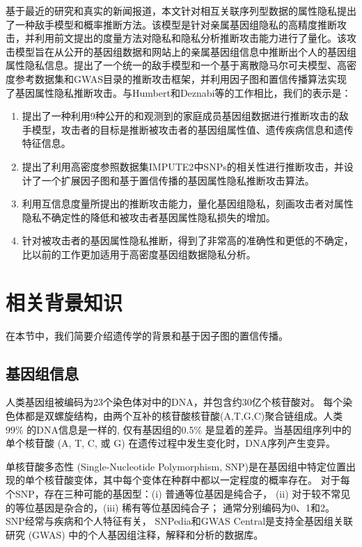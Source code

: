 基于最近的研究和真实的新闻报道，本文针对相互关联序列型数据的属性隐私提出了一种敌手模型和概率推断方法。该模型是针对亲属基因组隐私的高精度推断攻击，并利用前文提出的度量方法对隐私和隐私分析推断攻击能力进行了量化。该攻击模型旨在从公开的基因组数据和网站上的亲属基因组信息中推断出个人的基因组属性隐私信息。提出了一个统一的敌手模型和一个基于离散隐马尔可夫模型、高密度参考数据集和GWAS目录的推断攻击框架，并利用因子图和置信传播算法实现了基因属性隐私推断攻击。与Humbert和Deznabi等\cite{deznabi2018inference}的工作相比，我们的表示是：

\begin{enumerate}
	\item 提出了一种利用9种公开的和观测到的家庭成员基因组数据进行推断攻击的敌手模型，攻击者的目标是推断被攻击者的基因组属性值、遗传疾病信息和遗传特征信息。
	\item 提出了利用高密度参照数据集IMPUTE2\cite{howie2014impute2}中SNPs的相关性进行推断攻击，并设计了一个扩展因子图和基于置信传播的基因属性隐私推断攻击算法。
	\item 利用互信息度量所提出的推断攻击能力，量化基因组隐私，刻画攻击者对属性隐私不确定性的降低和被攻击者基因属性隐私损失的增加。
	\item 针对被攻击者的基因属性隐私推断，得到了非常高的准确性和更低的不确定，比以前的工作更加适用于高密度基因组数据隐私分析。
\end{enumerate}

\section{相关背景知识}
\label{sec:backgrounds}
在本节中，我们简要介绍遗传学的背景和基于因子图的置信传播。

\subsection{基因组信息}

人类基因组被编码为23个染色体对中的DNA，并包含约30亿个核苷酸对。 每个染色体都是双螺旋结构，由两个互补的核苷酸核苷酸(A,T,G,C)聚合链组成。人类 99\% 的DNA信息是一样的, 仅有基因组的0.5\% 是显着的差异。当基因组序列中的单个核苷酸 (A, T, C, 或 G) 在遗传过程中发生变化时，DNA序列产生变异。

单核苷酸多态性 (Single-Nucleotide Polymorphism, SNP)是在基因组中特定位置出现的单个核苷酸变体，其中每个变体在种群中都以一定程度的概率存在。 对于每个SNP，存在三种可能的基因型：(i) 普通等位基因是纯合子， (ii) 对于较不常见的等位基因是杂合的，(iii) 稀有等位基因纯合子； 通常分别编码为0、1和2。 SNP经常与疾病和个人特征有关， SNPedia和GWAS Central是支持全基因组关联研究 (GWAS) 中的个人基因组注释，解释和分析的数据库。

